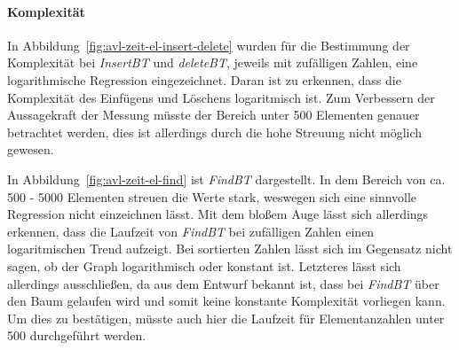 \paragraph{Komplexität}
In Abbildung~\ref{fig:avl-zeit-el-insert-delete} wurden für die Bestimmung der Komplexität
bei \textit{InsertBT} und \textit{deleteBT}, jeweils mit zufälligen Zahlen, eine logarithmische
Regression eingezeichnet.
Daran ist zu erkennen, dass die Komplexität des Einfügens und Löschens logaritmisch ist.
Zum Verbessern der Aussagekraft der Messung müsste der Bereich unter 500 Elementen genauer
betrachtet werden, dies ist allerdings durch die hohe Streuung nicht möglich gewesen.

In Abbildung~\ref{fig:avl-zeit-el-find} ist \textit{FindBT} dargestellt.
In dem Bereich von ca. 500 - 5000 Elementen streuen die Werte stark, weswegen sich eine sinnvolle
Regression nicht einzeichnen lässt.
Mit dem bloßem Auge lässt sich allerdings erkennen, dass die Laufzeit von \textit{FindBT} bei
zufälligen
Zahlen einen logaritmischen Trend aufzeigt.
Bei sortierten Zahlen lässt sich im Gegensatz nicht sagen, ob der Graph logarithmisch oder konstant
ist.
Letzteres lässt sich allerdings ausschließen, da aus dem Entwurf bekannt ist, dass bei
\textit{FindBT} über
den Baum gelaufen wird und somit keine konstante Komplexität vorliegen kann.
Um dies zu bestätigen, müsste auch hier die Laufzeit für Elementanzahlen unter 500
durchgeführt werden.

